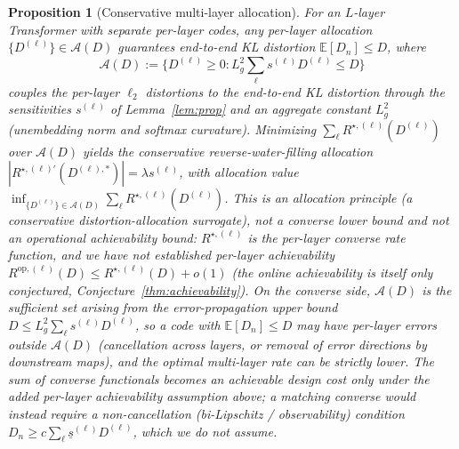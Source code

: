 \documentclass[11pt]{article}
\newcommand{\E}{\mathbb{E}}
\theoremstyle{plain}
\newtheorem{proposition}[theorem]{Proposition}
\theoremstyle{definition}
\theoremstyle{remark}
\begin{document}
\begin{proposition}[Conservative multi-layer allocation]\label{thm:multi-WZ}
For an $L$-layer Transformer with separate per-layer codes, any
per-layer allocation $\{D^{(\ell)}\} \in \mathcal{A}(D)$ guarantees
end-to-end KL distortion $\E[D_n] \le D$, where
\[
\mathcal{A}(D) := \{D^{(\ell)} \geq 0 : L_g^2 \textstyle\sum_\ell
s^{(\ell)} D^{(\ell)} \leq D\}
\]
couples the per-layer $\ell_2$ distortions to the end-to-end KL
distortion through the sensitivities $s^{(\ell)}$ of
Lemma~\ref{lem:prop} and an aggregate constant $L_g^2$ (unembedding
norm and softmax curvature). Minimizing
$\sum_\ell R^{\star,(\ell)}(D^{(\ell)})$ over $\mathcal{A}(D)$ yields
the conservative reverse-water-filling allocation
$|R^{\star,(\ell)\prime}(D^{(\ell),*})| = \lambda s^{(\ell)}$, with
allocation value
$\inf_{\{D^{(\ell)}\}\in\mathcal{A}(D)} \sum_\ell R^{\star,(\ell)}(D^{(\ell)})$.
This is an \emph{allocation principle} (a conservative
distortion-allocation surrogate), \emph{not} a converse lower bound and
\emph{not} an operational achievability bound: $R^{\star,(\ell)}$ is the
per-layer \emph{converse} rate function, and we have not established
per-layer achievability $R^{\mathrm{op},(\ell)}(D)\le R^{\star,(\ell)}(D)+o(1)$
(the online achievability is itself only conjectured,
Conjecture~\ref{thm:achievability}). On the converse side,
$\mathcal{A}(D)$ is the sufficient set arising from the
error-propagation \emph{upper} bound
$D \le L_g^2\sum_\ell s^{(\ell)}D^{(\ell)}$, so a code with
$\E[D_n]\le D$ may have per-layer errors outside $\mathcal{A}(D)$
(cancellation across layers, or removal of error directions by
downstream maps), and the optimal multi-layer rate can be strictly
lower. The sum of converse functionals becomes an achievable design
cost only under the added per-layer achievability assumption above; a
matching converse would instead require a non-cancellation
(bi-Lipschitz / observability) condition
$D_n \ge c\sum_\ell \underline s^{(\ell)} D^{(\ell)}$, which we do not
assume.
\end{proposition}
\end{document}
